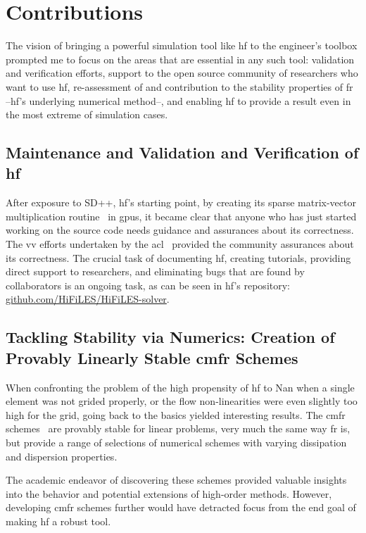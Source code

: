 \section{Contributions}

The vision of bringing a powerful simulation tool like \gls{hf} to the engineer's toolbox prompted me to focus on the areas that are essential in any such tool: validation and verification efforts, support to the open source community of researchers who want to use \gls{hf}, re-assessment of and contribution to the stability properties of \gls{fr} --\gls{hf}'s underlying numerical method--, and enabling \gls{hf} to provide a result even in the most extreme of simulation cases.
\subsection{Maintenance and Validation and Verification of \gls{hf}}
After exposure to SD++, \gls{hf}'s starting point, by creating its sparse matrix-vector multiplication routine~\cite{castonguay2011} in \gls{gpu}s, it became clear that anyone who has just started working on the source code needs guidance and assurances about its correctness. The \gls{vv} efforts undertaken by the \gls{acl}~\cite{lopez2014verification} provided the community assurances about its correctness. The crucial task of documenting \gls{hf}, creating tutorials, providing direct support to researchers, and eliminating bugs that are found by collaborators is an ongoing task, as can be seen in \gls{hf}'s repository: \url{github.com/HiFiLES/HiFiLES-solver}.

\subsection{Tackling Stability via Numerics: Creation of Provably Linearly Stable \gls{cmfr} Schemes}
When confronting the problem of the high propensity of \gls{hf} to Nan when a single element was not grided properly, or the flow non-linearities were even slightly too high for the grid, going back to the basics yielded interesting results. The \gls{cmfr} schemes~\cite{lopez2015cmfr} are provably stable for linear problems, very much the same way \gls{fr} is, but provide a range of selections of numerical schemes with varying dissipation and dispersion properties.

The academic endeavor of discovering these schemes provided valuable insights into the behavior and potential extensions of high-order methods. However, developing \gls{cmfr} schemes further would have detracted focus from the end goal of making \gls{hf} a robust tool.

